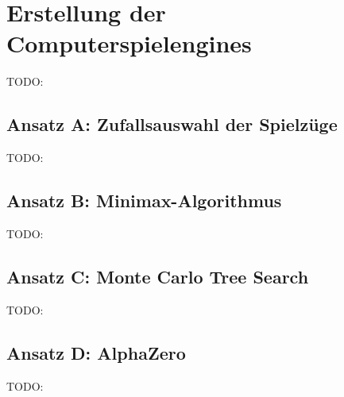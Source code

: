\chapter{Erstellung der Computerspielengines}
\label{chapter:erstellung-der-computerspielengines}

TODO:

\section{Ansatz A: Zufallsauswahl der Spielzüge}
\label{section:erstellung-ansatz-a}

TODO:

\section{Ansatz B: Minimax-Algorithmus}
\label{section:erstellung-ansatz-b}

TODO:

\section{Ansatz C: Monte Carlo Tree Search}
\label{section:erstellung-ansatz-c}

TODO:

\section{Ansatz D: AlphaZero}
\label{section:erstellung-ansatz-d}

TODO:
